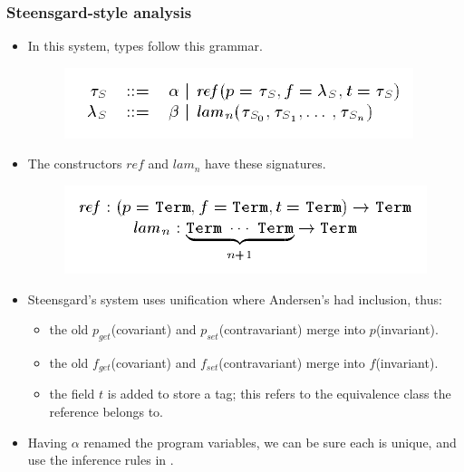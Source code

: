 \documentclass{beamer}
\begin{document}
\begin{frame}[allowframebreaks]
  \frametitle{Steensgard-style analysis}

  \begin{itemize}
  \item In this system, types follow this grammar.
    \begin{figure}
      \centering
      \includegraphics[scale=0.3]{steensgard_type_grammar.png}
    \end{figure}
  \item The constructors $ref$ and $lam_n$ have these signatures.
    \begin{figure}
      \centering
      \includegraphics[scale=0.3]{steensgard_constructor_signatures.png}
    \end{figure}
  \item Steensgard's system uses unification where Andersen's had
    inclusion, thus: 
    \begin{itemize}
    \item the old $p_{get}$(covariant) and $p_{set}$(contravariant)
      merge into $p$(invariant).
    \item the old $f_{get}$(covariant) and $f_{set}$(contravariant)
      merge into $f$(invariant).
    \item the field $t$ is added to store a tag; this refers to the
      equivalence class the reference belongs to.
    \end{itemize}
  \item Having $\alpha$ renamed the program variables, we can be sure
    each is unique, and use the inference rules in .
  \end{itemize}

  \framebreak


\end{frame}
\end{document}
